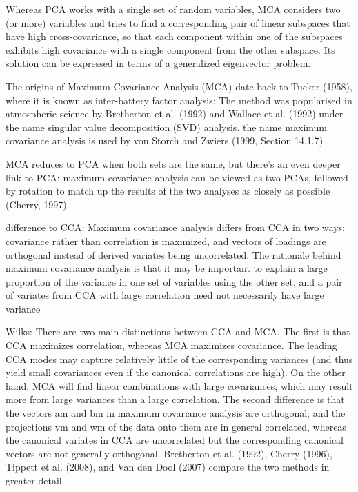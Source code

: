  

Whereas PCA works with a single set of random variables, MCA considers two (or more) variables and tries to find a corresponding pair of linear subspaces that have high cross-covariance, so that each component within one of the subspaces exhibits high covariance with a single component from the other subspace. Its solution can be expressed in terms of a generalized eigenvector problem.

The origins of Maximum Covariance Analysis (MCA) date back to Tucker (1958), where it is known as inter-battery factor analysis; The method was popularised in atmospheric science by Bretherton et al. (1992) and Wallace et al. (1992) under the name singular value decomposition (SVD) analysis. the name maximum covariance analysis is used by von Storch and Zwiers (1999, Section 14.1.7) 


MCA reduces to PCA when both sets are the same, but there's an even deeper link to PCA: maximum covariance analysis can be viewed as two PCAs, followed by rotation to match up the results of the two analyses as closely as possible (Cherry, 1997).


difference to CCA: 
Maximum covariance analysis diﬀers from CCA in two ways: covariance rather than correlation is maximized, and vectors of loadings are orthogonal instead of derived variates being uncorrelated. The rationale behind maximum covariance
analysis is that it may be important to explain a large proportion of
the variance in one set of variables using the other set, and a pair of
variates from CCA with large correlation need not necessarily have large
variance

Wilks:
There are two main distinctions between CCA and MCA. The first is that CCA maximizes correlation, whereas MCA maximizes covariance. The leading CCA modes may capture relatively little of the corresponding variances (and thus yield small covariances even if the canonical correlations are high). On the other hand, MCA will find linear combinations with large covariances, which may result
more from large variances than a large correlation. The second difference is that the vectors am and bm in maximum covariance analysis are orthogonal, and the projections vm and wm of the data onto them are in general correlated, whereas the canonical variates in CCA are uncorrelated but the corresponding
canonical vectors are not generally orthogonal. Bretherton et al. (1992), Cherry (1996), Tippett et al. (2008), and Van den Dool (2007) compare the two methods in greater detail.




